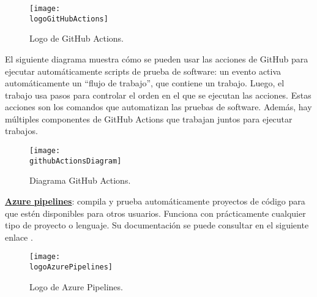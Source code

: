 \begin{compactitem}
    \begin{figure}[h]
        \centering
        \texttt{[image: \\logoGitHubActions]}
        \caption{Logo de GitHub Actions.}
    \end{figure}
    
    El siguiente diagrama muestra cómo se pueden usar las acciones de GitHub para ejecutar automáticamente scripts de prueba de software: un evento activa automáticamente un “flujo de trabajo”, que contiene un trabajo. Luego, el trabajo usa pasos para controlar el orden en el que se ejecutan las acciones. Estas acciones son los comandos que automatizan las pruebas de software. Además, hay múltiples componentes de GitHub Actions que trabajan juntos para ejecutar trabajos.
    \begin{figure}[h]
        \centering
        \texttt{[image: \\githubActionsDiagram]}
        \caption{Diagrama GitHub Actions.}
    \end{figure}
    \item \textbf{\underline{Azure pipelines}}: compila y prueba automáticamente proyectos de código para que estén disponibles para otros usuarios. Funciona con prácticamente cualquier tipo de proyecto o lenguaje. Su documentación se puede consultar en el siguiente enlace \cite{azurePipelines}.
    \begin{figure}[h]
        \centering
        \texttt{[image: \\logoAzurePipelines]}
        \caption{Logo de Azure Pipelines.}
    \end{figure}
    

\end{compactitem}
